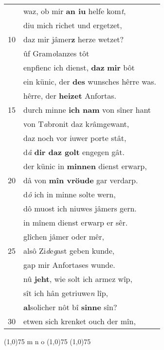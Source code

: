 \documentclass[8pt,a4paper,notitlepage]{article}
\begin{document}
\begin{table}[ht]
\begin{minipage}[t]{0.5\linewidth}
\begin{tabular}{rl}
 & waz, ob mir \textbf{an iu} helfe kom\textit{t},\\ 
 & diu mich richet und ergetzet,\\ 
10 & daz mir jâmer\textbf{z} herze wetzet?\\ 
 & ûf Gram\textit{o}lanzes tôt\\ 
 & enpfienc ich dienst, \textbf{daz} \textbf{mir} bôt\\ 
 & ein künic, der \textbf{des} wunsches hêrre was.\\ 
 & hêrre, der \textbf{heizet} Anfortas.\\ 
15 & durch minne \textbf{ich nam} von sîner hant\\ 
 & von T\textit{a}bronit daz k\textit{r}âmgewant,\\ 
 & daz noch vor iuwer porte stât,\\ 
 & d\textit{â} \textbf{dir daz golt} engegen gât.\\ 
 & der künic in \textbf{minnen} dienst erwarp,\\ 
20 & dâ von \textbf{mîn vröude} gar verdarp.\\ 
 & d\textit{ô} ich in minne solte wern,\\ 
 & dô muost ich niuwes jâmers gern.\\ 
 & in mînem dienst erwarp er sêr.\\ 
 & glîchen jâmer oder mêr,\\ 
25 & alsô Zi\textit{d}e\textit{g}ast geben kunde,\\ 
 & gap mir Anfortases wunde.\\ 
 & nû \textbf{jeht}, wie solt ich armez wîp,\\ 
 & sît ich hân getriuwe\textit{n} lîp,\\ 
 & \textbf{al}solicher nôt bî \textbf{sinne} sîn?\\ 
30 & etwen sich krenket ouch der mîn,\\ 
\end{tabular}
\scriptsize
\line(1,0){75} \newline
m n o \newline
\line(1,0){75} \newline
\newline
\line(1,0){75} \newline

\end{minipage}
\end{table}
\end{document}
